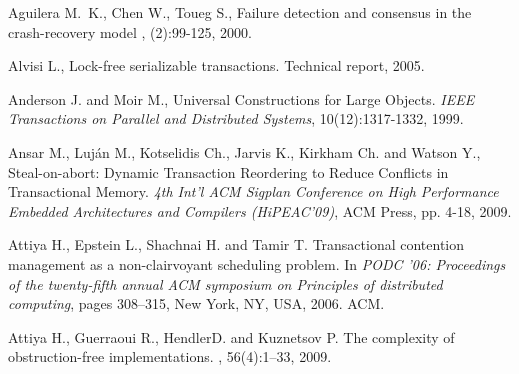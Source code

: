 \begin{thebibliography}{99}
{%


Aguilera M.~K., Chen W., Toueg S.,
\newblock Failure detection and consensus in the crash-recovery model
,
(2):99-125, 2000.

Alvisi L.,
\newblock Lock-free serializable transactions.
\newblock Technical report, 2005.



Anderson J. and Moir M., 
Universal Constructions for Large Objects. 
{\it  IEEE Transactions on Parallel and Distributed  Systems},
10(12):1317-1332,  1999.



Ansar M.,  Luj\'an M.,  Kotselidis Ch., Jarvis K.,  Kirkham Ch. 
and  Watson Y., 
Steal-on-abort: Dynamic Transaction Reordering to
Reduce Conflicts in Transactional Memory. 
{\it 4th  Int'l ACM Sigplan Conference on  High Performance Embedded  
Architectures and Compilers (HiPEAC'09)}, ACM Press,   pp. 4-18, 2009.






Attiya H., Epstein L., Shachnai H. and Tamir T.
\newblock Transactional contention management as a non-clairvoyant scheduling
  problem.
\newblock In {\em PODC '06: Proceedings of the twenty-fifth annual ACM
  symposium on Principles of distributed computing}, pages 308--315, New York,
  NY, USA, 2006. ACM.

Attiya H., Guerraoui R., HendlerD. and Kuznetsov P.
\newblock The complexity of obstruction-free implementations.
, 56(4):1--33, 2009.


}
\end{thebibliography}
